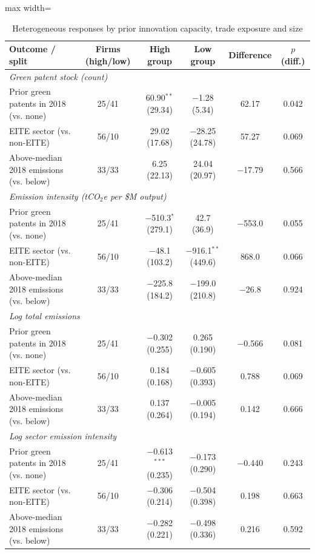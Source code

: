 \begin{table}[htbp]\centering\footnotesize
\caption{Heterogeneous responses by prior innovation capacity, trade exposure and size}
\label{tab:hetero}
\begin{adjustbox}{max width=\textwidth}
\begin{tabular}{lccccc}
\toprule
Outcome / split & Firms (high/low) & High group & Low group & Difference & $p$ (diff.) \\
\midrule
\multicolumn{6}{l}{\textit{Green patent stock (count)}} \\
\quad Prior green patents in 2018 (vs. none) & 25/41 & 60.90$^{**}$ (29.34) & $-$1.28 (5.34) & 62.17 & 0.042 \\
\quad EITE sector (vs. non-EITE) & 56/10 & 29.02 (17.68) & $-$28.25 (24.78) & 57.27 & 0.069 \\
\quad Above-median 2018 emissions (vs. below) & 33/33 & 6.25 (22.13) & 24.04 (20.97) & $-$17.79 & 0.566 \\
\multicolumn{6}{l}{\textit{Emission intensity (tCO$_2$e per \$M output)}} \\
\quad Prior green patents in 2018 (vs. none) & 25/41 & $-$510.3$^{*}$ (279.1) & 42.7 (36.9) & $-$553.0 & 0.055 \\
\quad EITE sector (vs. non-EITE) & 56/10 & $-$48.1 (103.2) & $-$916.1$^{**}$ (449.6) & 868.0 & 0.066 \\
\quad Above-median 2018 emissions (vs. below) & 33/33 & $-$225.8 (184.2) & $-$199.0 (210.8) & $-$26.8 & 0.924 \\
\multicolumn{6}{l}{\textit{Log total emissions}} \\
\quad Prior green patents in 2018 (vs. none) & 25/41 & $-$0.302 (0.255) & 0.265 (0.190) & $-$0.566 & 0.081 \\
\quad EITE sector (vs. non-EITE) & 56/10 & 0.184 (0.168) & $-$0.605 (0.393) & 0.788 & 0.069 \\
\quad Above-median 2018 emissions (vs. below) & 33/33 & 0.137 (0.264) & $-$0.005 (0.194) & 0.142 & 0.666 \\
\multicolumn{6}{l}{\textit{Log sector emission intensity}} \\
\quad Prior green patents in 2018 (vs. none) & 25/41 & $-$0.613$^{***}$ (0.235) & $-$0.173 (0.290) & $-$0.440 & 0.243 \\
\quad EITE sector (vs. non-EITE) & 56/10 & $-$0.306 (0.214) & $-$0.504 (0.398) & 0.198 & 0.663 \\
\quad Above-median 2018 emissions (vs. below) & 33/33 & $-$0.282 (0.221) & $-$0.498 (0.336) & 0.216 & 0.592 \\

\end{tabular}
\end{adjustbox}
\end{table}
